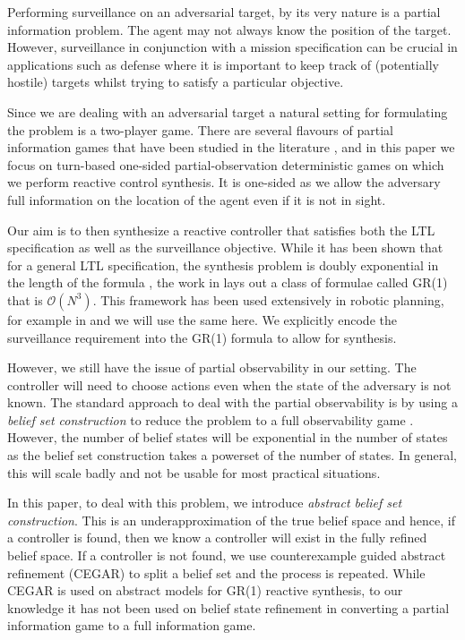 Performing surveillance on an adversarial target, by its very nature is a partial information problem. The agent may not always know the position of the target. However, surveillance in conjunction with a mission specification can be crucial in applications such as defense where it is important to keep track of (potentially hostile) targets whilst trying to satisfy a particular objective. 

Since we are dealing with an adversarial target a natural setting for formulating the problem is a two-player game. There are several flavours of partial information games that have been studied in the literature \cite{Chatterjee2013}, and in this paper we focus on turn-based one-sided partial-observation deterministic games on which we perform reactive control synthesis. It is one-sided as we allow the adversary full information on the location of the agent even if it is not in sight. 

Our aim is to then synthesize a reactive controller that satisfies both the LTL specification as well as the surveillance objective. While it has been shown that for a general LTL specification, the synthesis problem is doubly exponential in the length of the formula \cite{Pnueli1989}, the work in \cite{Piterman2006} lays out a class of formulae called GR(1) that is $\mathcal{O}(N^3)$. This framework has been used extensively in robotic planning, for example in \cite{wong2012,Kress2007} and we will use the same here. We explicitly encode the surveillance requirement into the GR(1) formula to allow for synthesis. 

However, we still have the issue of partial observability in our setting. The controller will need to choose actions even when the state of the adversary is not known. The standard approach to deal with the partial observability is by using a \emph{belief set construction} to reduce the problem to a full observability game \cite{Bertoli2006}. However, the number of belief states will be exponential in the number of states \cite{Rintanen2004} as the belief set construction takes a powerset of the number of states. In general, this will scale badly and not be usable for most practical situations. 

In this paper, to deal with this problem, we introduce \emph{abstract belief set construction}. This is an underapproximation of the true belief space and hence, if a controller is found, then we know a controller will exist in the fully refined belief space. If a controller is not found, we use counterexample guided abstract refinement (CEGAR) to split a belief set and the process is repeated. While CEGAR is used on abstract models for GR(1) reactive synthesis, to our knowledge it has not been used on belief state refinement in converting a partial information game to a full information game. 



